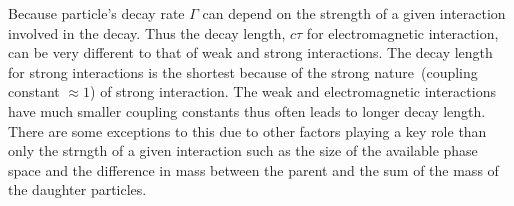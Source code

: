 {Because particle's decay rate $\Gamma$ can depend on the strength of a given interaction involved in the decay. Thus the decay length, $c\tau$  for electromagnetic interaction, can be very different to that of weak and strong interactions. The decay length for strong interactions is the shortest because of the strong nature~(coupling constant $\approx 1$) of strong interaction. The weak and electromagnetic interactions have much smaller coupling constants thus often leads to longer decay length. There are some exceptions to this due to other factors playing a key role than only the strngth of a given interaction such as the size of the available phase space and the difference in mass between the parent and the sum of the mass of the daughter particles.
}
